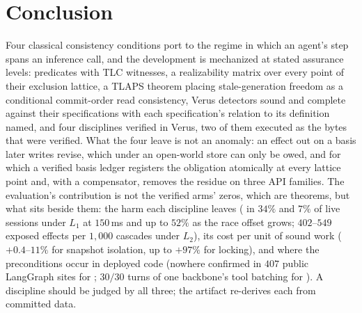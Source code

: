 \section{Conclusion}
\label{sec:conclusion}

Four classical consistency conditions port to the regime in which an agent's
step spans an inference call, and the development is mechanized at stated
assurance levels: \TLA{} predicates with TLC witnesses, a realizability
matrix over every point of their exclusion lattice, a TLAPS theorem placing
stale-generation freedom as a conditional commit-order read consistency,
Verus detectors sound and complete against their specifications with each
specification's relation to its definition named, and four disciplines
verified in Verus, two of them executed as the bytes that were verified.
What the four leave is not an anomaly: an effect out on a basis later
writes revise, which under an open-world store can only be owed, and for
which a verified basis ledger registers the obligation atomically at every
lattice point and, with a compensator, removes the residue on three API
families. The evaluation's contribution is not the verified arms' zeros, which are
theorems, but what sits beside them: the harm each discipline leaves (\Rp{}
in $34\%$ and $7\%$ of live sessions under $L_1$ at $150$\,ms and up to
$52\%$ as the race offset grows; $402$--$549$
exposed effects per $1{,}000$ cascades under $L_2$), its cost per unit of
sound work ($+0.4$--$11\%$ for snapshot isolation, up to $+97\%$ for
locking), and where the preconditions occur in deployed code (nowhere
confirmed in $407$ public LangGraph sites for ; $30/30$ turns of one
backbone's tool batching for ). A discipline should be judged by all three; the artifact re-derives each
from committed data.
